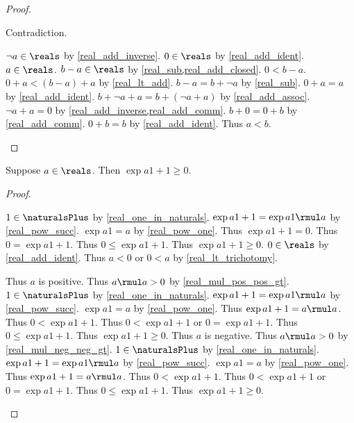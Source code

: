 \begin{proof}
\begin{subproof}
\begin{subproof}
\begin{byCase}
                Contradiction.
            \end{byCase}
        \end{subproof}
        $\neg{a}\in\reals$ by \cref{real_add_inverse}.
        $0\in\reals$ by \cref{real_add_ident}.
        $a\in\reals$.
        $b - a\in\reals$ by \cref{real_sub,real_add_closed}.
        $0 < b - a$.
        $0 + a < (b - a) + a$ by \cref{real_lt_add}.
        $b - a = b + \neg{a}$ by \cref{real_sub}.
        $0 + a = a$ by \cref{real_add_ident}.
        $b + \neg{a} + a = b + (\neg{a} + a)$ by \cref{real_add_assoc}.
        $\neg{a} + a = 0$ by \cref{real_add_inverse,real_add_comm}.
        $b + 0 = 0 + b$ by \cref{real_add_comm}.
        $0 + b = b$ by \cref{real_add_ident}.
        Thus $a < b$.
    \end{subproof}
\end{proof}

\begin{theorem}\label{real_sq_nonnegative}
    Suppose $a\in\reals$.
    Then $\exp{a}{1+1} \geq 0$.
\end{theorem}
\begin{proof}
    \begin{byCase}
        $1\in\naturalsPlus$ by \cref{real_one_in_naturals}.
        $\exp{a}{1+1} = \exp{a}{1} \rmul a$ by \cref{real_pow_succ}.
        $\exp{a}{1} = a$ by \cref{real_pow_one}.
        Thus $\exp{a}{1+1} = 0$.
        Thus $0 = \exp{a}{1+1}$.
        Thus $0 \leq \exp{a}{1+1}$.
        Thus $\exp{a}{1+1} \geq 0$.
        $0\in\reals$ by \cref{real_add_ident}.
        Thus $a < 0$ or $0 < a$ by \cref{real_lt_trichotomy}.
        \begin{byCase}
            Thus $a$ is positive.
            Thus $a \rmul a > 0$ by \cref{real_mul_pos_pos_gt}.
            $1\in\naturalsPlus$ by \cref{real_one_in_naturals}.
            $\exp{a}{1+1} = \exp{a}{1} \rmul a$ by \cref{real_pow_succ}.
            $\exp{a}{1} = a$ by \cref{real_pow_one}.
            Thus $\exp{a}{1+1} = a \rmul a$.
            Thus $0 < \exp{a}{1+1}$.
            Thus $0 < \exp{a}{1+1}$ or $0 = \exp{a}{1+1}$.
            Thus $0 \leq \exp{a}{1+1}$.
            Thus $\exp{a}{1+1} \geq 0$.
            Thus $a$ is negative.
            Thus $a \rmul a > 0$ by \cref{real_mul_neg_neg_gt}.
            $1\in\naturalsPlus$ by \cref{real_one_in_naturals}.
            $\exp{a}{1+1} = \exp{a}{1} \rmul a$ by \cref{real_pow_succ}.
            $\exp{a}{1} = a$ by \cref{real_pow_one}.
            Thus $\exp{a}{1+1} = a \rmul a$.
            Thus $0 < \exp{a}{1+1}$.
            Thus $0 < \exp{a}{1+1}$ or $0 = \exp{a}{1+1}$.
            Thus $0 \leq \exp{a}{1+1}$.
            Thus $\exp{a}{1+1} \geq 0$.
        \end{byCase}
    \end{byCase}
\end{proof}

